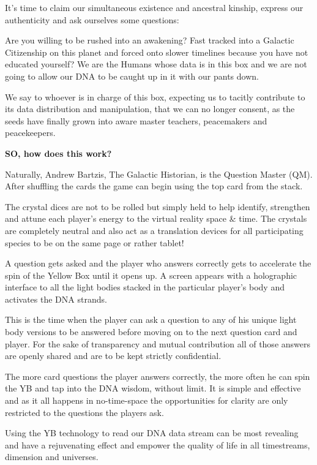 It's time to claim our simultaneous existence and ancestral kinship,
express our authenticity and ask ourselves some questions:

Are you willing to be rushed into an awakening? Fast tracked into a
Galactic Citizenship on this planet and forced onto slower timelines
because you have not educated yourself? We are the Humans whose data is
in this box and we are not going to allow our DNA to be caught up in it
with our pants down.

We say to whoever is in charge of this box, expecting us to tacitly
contribute to its data distribution and manipulation, that we can no
longer consent, as the seeds have finally grown into aware master
teachers, peacemakers and peacekeepers.

\textbf{SO, how does this work?}

Naturally, Andrew Bartzis, The Galactic Historian, is the Question
Master (QM). After shuffling the cards the game can begin using the top
card from the stack.

The crystal dices are not to be rolled but simply held to help identify,
strengthen and attune each player's energy to the virtual reality space
\& time. The crystals are completely neutral and also act as a
translation devices for all participating species to be on the same page
or rather tablet!

A question gets asked and the player who answers correctly gets to
accelerate the spin of the Yellow Box until it opens up. A screen
appears with a holographic interface to all the light bodies stacked in
the particular player's body and activates the DNA strands.

This is the time when the player can ask a question to any of his unique
light body versions to be answered before moving on to the next question
card and player. For the sake of transparency and mutual contribution
all of those answers are openly shared and are to be kept strictly
confidential.

The more card questions the player answers correctly, the more often he
can spin the YB and tap into the DNA wisdom, without limit. It is simple
and effective and as it all happens in no-time-space the opportunities
for clarity are only restricted to the questions the players ask.

Using the YB technology to read our DNA data stream can be most
revealing and have a rejuvenating effect and empower the quality of life
in all timestreams, dimension and universes.

